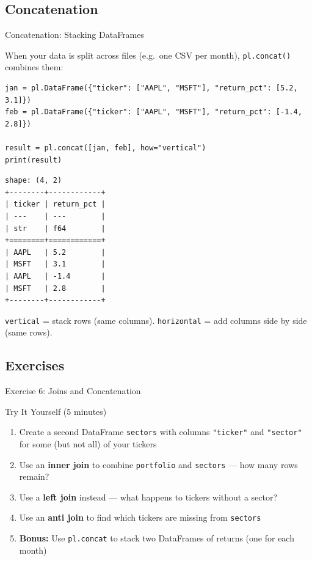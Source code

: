\documentclass[9pt,aspectratio=169]{beamer}
\newcommand{\py}[1]{\lstinline[language=Python]{#1}}
\begin{document}
\subsection{Concatenation}
\begin{frame}[fragile]{Concatenation: Stacking DataFrames}

When your data is split across files (e.g.\ one CSV per month), \py{pl.concat()} combines them:

\begin{lstlisting}
jan = pl.DataFrame({"ticker": ["AAPL", "MSFT"], "return_pct": [5.2, 3.1]})
feb = pl.DataFrame({"ticker": ["AAPL", "MSFT"], "return_pct": [-1.4, 2.8]})

result = pl.concat([jan, feb], how="vertical")
print(result)
\end{lstlisting}

\begin{lstlisting}[style=output]
shape: (4, 2)
+--------+------------+
| ticker | return_pct |
| ---    | ---        |
| str    | f64        |
+========+============+
| AAPL   | 5.2        |
| MSFT   | 3.1        |
| AAPL   | -1.4       |
| MSFT   | 2.8        |
+--------+------------+
\end{lstlisting}

\texttt{vertical} = stack rows (same columns). \texttt{horizontal} = add columns side by side (same rows).

\end{frame}


\subsection{Exercises}
\begin{frame}[fragile]{Exercise 6: Joins and Concatenation}

\begin{alertblock}{Try It Yourself (5 minutes)}
\begin{enumerate}
    \item Create a second DataFrame \texttt{sectors} with columns \texttt{"ticker"} and \texttt{"sector"} for some (but not all) of your tickers
    \item Use an \textbf{inner join} to combine \texttt{portfolio} and \texttt{sectors} --- how many rows remain?
    \item Use a \textbf{left join} instead --- what happens to tickers without a sector?
    \item Use an \textbf{anti join} to find which tickers are missing from \texttt{sectors}
    \item \textbf{Bonus:} Use \texttt{pl.concat} to stack two DataFrames of returns (one for each month)
\end{enumerate}
\end{alertblock}

\end{frame}
\end{document}
